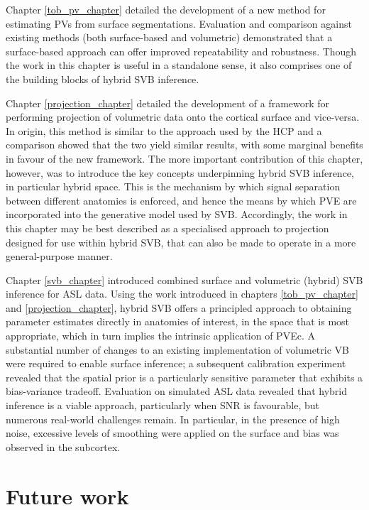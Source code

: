 Chapter \ref{tob_pv_chapter} detailed the development of a new method for estimating PVs from surface segmentations. Evaluation and comparison against existing methods (both surface-based and volumetric) demonstrated that a surface-based approach can offer improved repeatability and robustness. Though the work in this chapter is useful in a standalone sense, it also comprises one of the building blocks of hybrid SVB inference. 

Chapter \ref{projection_chapter} detailed the development of a framework for performing projection of volumetric data onto the cortical surface and vice-versa. In origin, this method is similar to the approach used by the HCP and a comparison showed that the two yield similar results, with some marginal benefits in favour of the new framework. The more important contribution of this chapter, however, was to introduce the key concepts underpinning hybrid SVB inference, in particular hybrid space. This is the mechanism by which signal separation between different anatomies is enforced, and hence the means by which PVE are incorporated into the generative model used by SVB. Accordingly, the work in this chapter may be best described as a specialised approach to projection designed for use within hybrid SVB, that can also be made to operate in a more general-purpose manner. 

Chapter \ref{svb_chapter} introduced combined surface and volumetric (hybrid) SVB inference for ASL data. Using the work introduced in chapters \ref{tob_pv_chapter} and \ref{projection_chapter}, hybrid SVB offers a principled approach to obtaining parameter estimates directly in anatomies of interest, in the space that is most appropriate, which in turn implies the intrinsic application of PVEc. A substantial number of changes to an existing implementation of volumetric VB were required to enable surface inference; a subsequent calibration experiment revealed that the spatial prior is a particularly sensitive parameter that exhibits a bias-variance tradeoff. Evaluation on simulated ASL data revealed that hybrid inference is a viable approach, particularly when SNR is favourable, but numerous real-world challenges remain. In particular, in the presence of high noise, excessive levels of smoothing were applied on the surface and bias was observed in the subcortex. 


\section{Future work}

